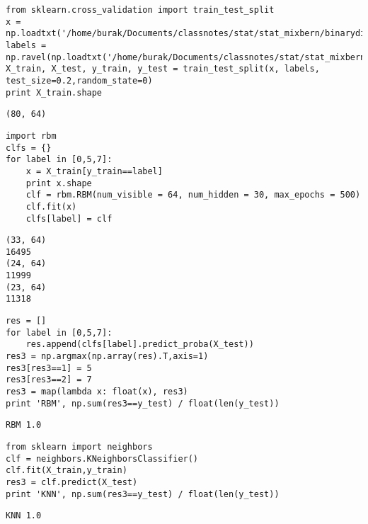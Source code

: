 \documentclass[12pt,fleqn]{article}\usepackage{../common}
\begin{document}
\begin{verbatim}
from sklearn.cross_validation import train_test_split
x = np.loadtxt('/home/burak/Documents/classnotes/stat/stat_mixbern/binarydigits.txt')
labels = np.ravel(np.loadtxt('/home/burak/Documents/classnotes/stat/stat_mixbern/bindigitlabels.txt'))
X_train, X_test, y_train, y_test = train_test_split(x, labels, test_size=0.2,random_state=0)
print X_train.shape
\end{verbatim}

\begin{verbatim}
(80, 64)
\end{verbatim}

\begin{verbatim}
import rbm
clfs = {}
for label in [0,5,7]:
    x = X_train[y_train==label]
    print x.shape
    clf = rbm.RBM(num_visible = 64, num_hidden = 30, max_epochs = 500)
    clf.fit(x)
    clfs[label] = clf
\end{verbatim}

\begin{verbatim}
(33, 64)
16495
(24, 64)
11999
(23, 64)
11318
\end{verbatim}

\begin{verbatim}
res = []
for label in [0,5,7]:
    res.append(clfs[label].predict_proba(X_test))
res3 = np.argmax(np.array(res).T,axis=1)
res3[res3==1] = 5
res3[res3==2] = 7
res3 = map(lambda x: float(x), res3)
print 'RBM', np.sum(res3==y_test) / float(len(y_test))
\end{verbatim}

\begin{verbatim}
RBM 1.0
\end{verbatim}

\begin{verbatim}
from sklearn import neighbors
clf = neighbors.KNeighborsClassifier()
clf.fit(X_train,y_train)
res3 = clf.predict(X_test)    
print 'KNN', np.sum(res3==y_test) / float(len(y_test))
\end{verbatim}

\begin{verbatim}
KNN 1.0
\end{verbatim}
\end{document}
